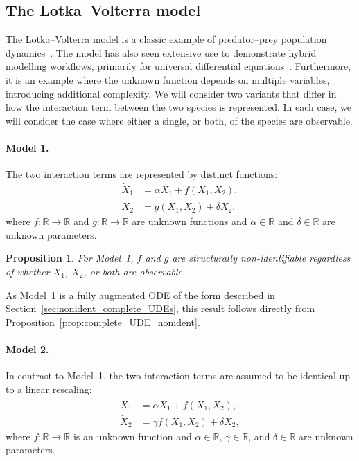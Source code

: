 \documentclass{article}
\theoremstyle{plain}
\newtheorem{proposition}{Proposition}[section]
\theoremstyle{definition}
\begin{document}
{%

\subsection{The Lotka--Volterra model} \label{sec:applications_LV}

The Lotka--Volterra model is a classic example of predator--prey population dynamics~\cite{segel_j_2003}. The model has also seen extensive use to demonstrate hybrid modelling workflows, primarily for universal differential equations~\cite{dandekar_bayesian_2022,fronk_bayesian_2024,giampiccolo_robust_2024,grigorian_learning_2024,rackauckas_universal_2021}. Furthermore, it is an example where the unknown function depends on multiple variables, introducing additional complexity. We will consider two variants that differ in how the interaction term between the two species is represented. In each case, we will consider the case where either a single, or both, of the species are observable.

\paragraph{Model 1.} The two interaction terms are represented by distinct functions:
\begin{align}
    \dot{X}_1 &= \alpha X_1 + f(X_1,X_2), \label{eq:LV1_dXdt} \\
    \dot{X}_2 &= g(X_1,X_2) + \delta X_2. \label{eq:LV1_dYdt}
\end{align}
where $f:\mathbb{R}\to\mathbb{R}$ and $g:\mathbb{R}\to\mathbb{R}$ are unknown functions and $\alpha\in\mathbb{R}$ and $\delta\in\mathbb{R}$ are unknown parameters.

\begin{proposition} \label{prop:LV1_nonident}
For Model~1, $f$ and $g$ are structurally non-identifiable regardless of whether $X_1$, $X_2$, or both are observable.
\end{proposition}

As Model~1 is a fully augmented ODE of the form described in Section~\ref{sec:nonident_complete_UDEs}, this result follows directly from Proposition~\ref{prop:complete_UDE_nonident}.

\paragraph{Model 2.} In contrast to Model~1, the two interaction terms are assumed to be identical up to a linear rescaling:
\begin{align}
    \dot{X}_1 &= \alpha X_1 + f(X_1,X_2),        \label{eq:LV2_dXdt} \\
    \dot{X}_2 &= \gamma f(X_1,X_2) + \delta X_2, \label{eq:LV2_dYdt}
\end{align}
where $f:\mathbb{R}\to\mathbb{R}$ is an unknown function and $\alpha\in\mathbb{R}$, $\gamma\in\mathbb{R}$, and $\delta\in\mathbb{R}$ are unknown parameters.

}
\end{document}

